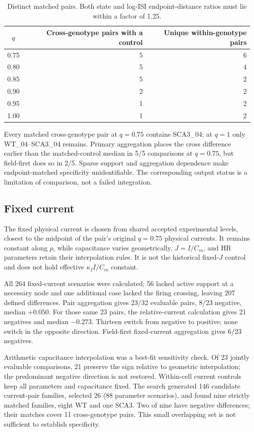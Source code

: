 \documentclass[11pt,a4paper]{article}
\begin{document}
\begin{table}[htbp]\centering\small
\caption{Distinct matched pairs. Both state and log-ISI endpoint-distance ratios must lie within a factor of 1.25.}
\begin{tabular}{@{}crr@{}}\toprule $q$&Cross-genotype pairs with a control&Unique within-genotype pairs\\\midrule
0.75&5&6\\0.80&5&4\\0.85&5&2\\0.90&2&2\\0.95&1&2\\1.00&1&2\\\bottomrule\end{tabular}\end{table}

Every matched cross-genotype pair at $q=0.75$ contains SCA3\_04; at $q=1$ only WT\_04--SCA3\_04 remains. Primary aggregation places the cross difference earlier than the matched-control median in 5/5 comparisons at $q=0.75$, but field-first does so in 2/5. Sparse support and aggregation dependence make endpoint-matched specificity unidentifiable. The corresponding output status is a limitation of comparison, not a failed integration.

\subsection*{Fixed current}
The fixed physical current is chosen from shared accepted experimental levels, closest to the midpoint of the pair's original $q=0.75$ physical currents. It remains constant along $p$, while capacitance varies geometrically, $J=I/C_m$, and HR parameters retain their interpolation rules. It is not the historical fixed-$J$ control and does not hold effective $\kappa_I I/C_m$ constant.

All 264 fixed-current scenarios were calculated; 56 lacked active support at a necessary node and one additional case lacked the firing crossing, leaving 207 defined differences. Pair aggregation gives 23/32 evaluable pairs, 8/23 negative, median $+0.050$. For those same 23 pairs, the relative-current calculation gives 21 negatives and median $-0.273$. Thirteen switch from negative to positive; none switch in the opposite direction. Field-first fixed-current aggregation gives 6/23 negatives.

Arithmetic capacitance interpolation was a best-fit sensitivity check. Of 23 jointly evaluable comparisons, 21 preserve the sign relative to geometric interpolation; the predominant negative direction is not restored. Within-cell current controls keep all parameters and capacitance fixed. The search generated 146 candidate current-pair families, selected 26 (88 parameter scenarios), and found nine strictly matched families, eight WT and one SCA3. Two of nine have negative differences; their matches cover 11 cross-genotype pairs. This small overlapping set is not sufficient to establish specificity.
\end{document}
